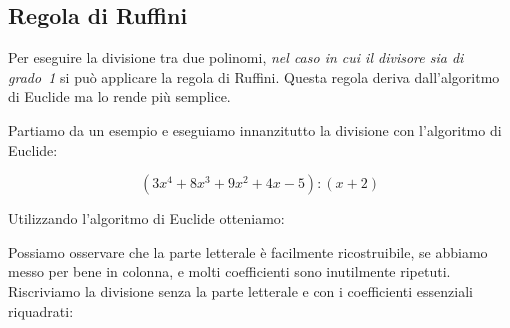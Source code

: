 \subsection{Regola di Ruffini}
\label{subsec:divpol_divisione_ruffini}

Per eseguire la divisione tra due polinomi, \emph{nel caso in cui il
divisore sia di grado~1} si può applicare la regola di Ruffini.
Questa regola deriva dall'algoritmo di Euclide ma lo rende più semplice.

% 

Partiamo da un esempio e eseguiamo innanzitutto la divisione con l'algoritmo 
di Euclide:


\[\left(3 x^4 +8 x^3 +9 x^2 +4 x -5\right) : (x + 2)\]

Utilizzando l'algoritmo di Euclide otteniamo:

\begin{inaccessibleblock}
\begin{center}
 
\end{center}
\end{inaccessibleblock}

Possiamo osservare che la parte letterale è facilmente ricostruibile, se 
abbiamo messo per bene in colonna, e molti coefficienti sono inutilmente 
ripetuti. Riscriviamo la divisione senza la parte letterale e con i
coefficienti essenziali riquadrati:

\begin{inaccessibleblock}
\begin{center}
 
\end{center}
\end{inaccessibleblock}

